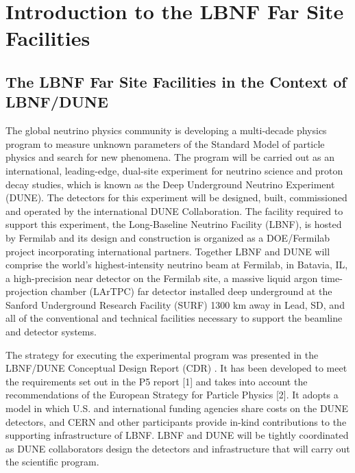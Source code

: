 \chapter{Introduction to the LBNF Far Site Facilities}
\label{ch:intro-intro}

\section{The LBNF Far Site Facilities in the Context of LBNF/DUNE}
\label{sec:fs-facil-context}

The global neutrino physics community is developing a multi-decade physics program to measure 
unknown parameters of the Standard Model of particle physics and search for new phenomena. The 
program will be carried out as an international, leading-edge, dual-site experiment for neutrino science 
and proton decay studies, which is known as the Deep Underground Neutrino Experiment (DUNE). The 
detectors for this experiment will be designed, built, commissioned and operated by the international 
DUNE Collaboration. The facility required to support this experiment, the Long-Baseline Neutrino Facility 
(LBNF), is hosted by Fermilab and its design and construction is organized as a DOE/Fermilab project 
incorporating international partners. Together LBNF and DUNE will comprise the world's highest-intensity 
neutrino beam at Fermilab, in Batavia, IL, a high-precision near detector on the Fermilab site, a massive 
liquid argon time-projection chamber (LArTPC) far detector installed deep underground at the Sanford 
Underground Research Facility (SURF) 1300 km away in Lead, SD, and all of the conventional and technical 
facilities necessary to support the beamline and detector systems.

The strategy for executing the experimental program was presented in the LBNF/DUNE Conceptual Design Report (CDR) . It  
has been developed to meet the requirements set out in the P5 report [1]  and takes into 
account the recommendations of the European Strategy for Particle Physics [2].  It adopts a 
model in which U.S. and international funding agencies share costs on the DUNE detectors, and CERN and 
other participants provide in-kind contributions to the supporting infrastructure  of LBNF. LBNF and DUNE 
will be tightly coordinated as DUNE collaborators design the detectors and infrastructure that will carry out 
the scientific program.

